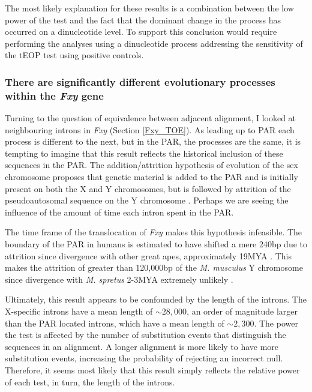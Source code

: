 The most likely explanation for these results is a combination between the low power of the test and the fact that the dominant change in the process has occurred on a dinucleotide level. To support this conclusion would require performing the analyses using a dinucleotide process addressing the sensitivity of the tEOP test using positive controls. 

\subsubsection{There are significantly different evolutionary processes within the \textit{Fxy} gene}

Turning to the question of equivalence between adjacent alignment, I looked at neighbouring introns in \textit{Fxy} (Section \ref{Fxy_TOE}). As leading up to PAR each process is different to the next, but in the PAR, the processes are the same, it is tempting to imagine that this result reflects the historical inclusion of these sequences in the PAR. The addition/attrition hypothesis of evolution of the sex chromosome proposes that genetic material is added to the PAR and is initially present on both the X and Y chromosomes, but is followed by attrition of the pseudoautosomal sequence on the Y chromosome  \citep{Graves1995TheGenes}. Perhaps we are seeing the influence of the amount of time each intron spent in the PAR. 

The time frame of the translocation of \textit{Fxy} makes this hypothesis infeasible. The boundary of the PAR in humans is estimated to have shifted a mere 240bp due to attrition since divergence with other great apes, approximately 19MYA \citep{Mensah2014PseudoautosomalPopulation}. This makes the attrition of greater than 120,000bp of the \textit{M. musculus} Y chromosome since divergence with \textit{M. spretus} 2-3MYA extremely unlikely \citep{Huang2005HowMammals}. 

Ultimately, this result appears to be confounded by the length of the introns. The X-specific introns have a mean length of $\sim28,000$, an order of magnitude larger than the PAR located introns, which have a mean length of $\sim2,300$. The power the test is affected by the number of substitution events that distinguish the sequences in an alignment. A longer alignment is more likely to have more substitution events, increasing the probability of rejecting an incorrect null. Therefore, it seems most likely that this result simply reflects the relative power of each test, in turn, the length of the introns. 

